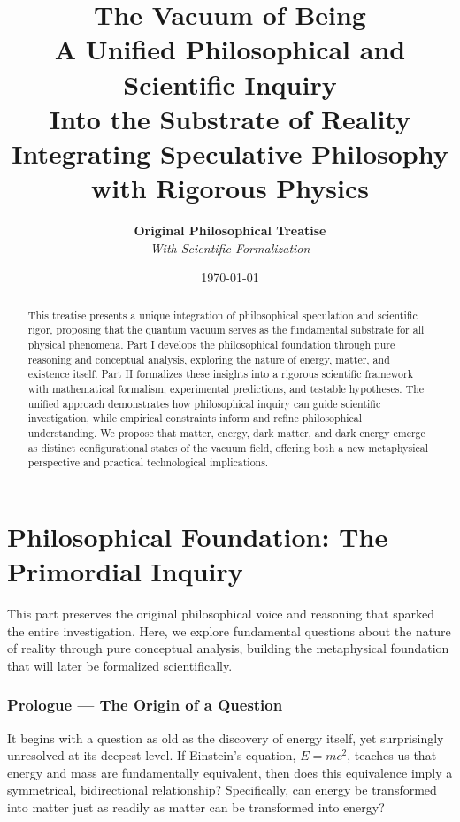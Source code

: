 \documentclass[12pt,a4paper]{article}
\title{
    \vspace{-2cm}
    {\Huge\textbf{The Vacuum of Being}}\\
    \vspace{0.5cm}
    {\Large A Unified Philosophical and Scientific Inquiry}\\
    {\Large Into the Substrate of Reality}\\
    \vspace{0.5cm}
    {\normalsize Integrating Speculative Philosophy with Rigorous Physics}
}
\author{
    \textbf{Original Philosophical Treatise}\\
    \textit{With Scientific Formalization}
}
\date{\today}
\begin{document}
\maketitle

\begin{abstract}
This treatise presents a unique integration of philosophical speculation and scientific rigor, proposing that the quantum vacuum serves as the fundamental substrate for all physical phenomena. Part I develops the philosophical foundation through pure reasoning and conceptual analysis, exploring the nature of energy, matter, and existence itself. Part II formalizes these insights into a rigorous scientific framework with mathematical formalism, experimental predictions, and testable hypotheses. The unified approach demonstrates how philosophical inquiry can guide scientific investigation, while empirical constraints inform and refine philosophical understanding. We propose that matter, energy, dark matter, and dark energy emerge as distinct configurational states of the vacuum field, offering both a new metaphysical perspective and practical technological implications.
\end{abstract}

\tableofcontents
\newpage


\part{Philosophical Foundation: The Primordial Inquiry}

\begin{philosophicalbox}
This part preserves the original philosophical voice and reasoning that sparked the entire investigation. Here, we explore fundamental questions about the nature of reality through pure conceptual analysis, building the metaphysical foundation that will later be formalized scientifically.
\end{philosophicalbox}



\section{Prologue — The Origin of a Question}

It begins with a question as old as the discovery of energy itself, yet surprisingly unresolved at its deepest level. If Einstein's equation, $E = mc^2$, teaches us that energy and mass are fundamentally equivalent, then does this equivalence imply a symmetrical, bidirectional relationship? Specifically, can energy be transformed into matter just as readily as matter can be transformed into energy?
\end{document}
